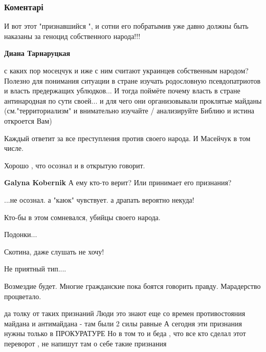  
 
 
 
 
\subsubsection{Коментарі}

\begin{itemize} %
И вот этот "признавшийся ", и сотни его побратымив уже давно должны быть наказаны за геноцид собственного народа!!!

\begin{itemize} %
\textbf{Диана Тарнаруцкая} 

с каких пор мосецчук и иже с ним считают украинцев собственным народом? Полезно
для понимания ситуации в стране изучать родословную псевдопатриотов и власть
предержащих ублюдков... И тогда поймёте почему власть в стране антинародная по
сути своей... и для чего они организовывали проклятые майданы
(см."территориализм" и внимательно изучайте / анализируйте Библию и истина
откроется Вам)

\end{itemize} %

Каждый ответит за все преступления против своего народа. И Масейчук в том числе.

Хорошо , что осознал и в открытую говорит.

\begin{itemize} %
\textbf{Galyna Kobernik} А ему кто-то верит? Или принимает его признания?

...не осознал. а "каюк" чувствует. а драпать вероятно некуда!
\end{itemize} %

Кто-бы в этом сомневался, убийцы своего народа.

Подонки...

Скотина, даже слушать не хочу!

Не приятный тип....

Возмездие будет. Многие гражданские пока боятся говорить правду. Марадерство процветало.


да толку от таких признаний Люди это знают еще со времен противостояния майдана
и антимайдана - там были 2 силы равные А сегодня эти признания нужны только в
ПРОКУРАТУРЕ Но в том то и беда , что все кто сделал этот переворот , не напишут
там о себе такие признания

\end{itemize} %

